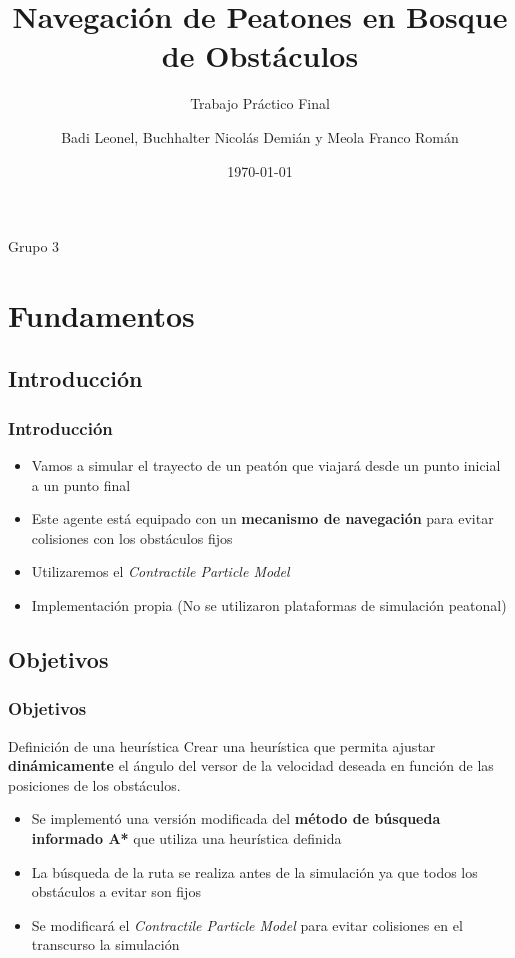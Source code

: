 \documentclass[hyperref={pdfpagelayout=SinglePage}]{beamer}
\title{Navegación de Peatones en Bosque de Obstáculos}
\subtitle{Trabajo Práctico Final}
\author{Badi Leonel, Buchhalter Nicolás Demián y Meola Franco Román}
\date{\today}
\makeatletter
\newcommand{\parttableofcontents}{\@starttoc{parttoc}}
\makeatother
\begin{document}
\begin{frame}[plain]
    \frametitle{} 
    \titlepage
    \centering
	Grupo 3
\end{frame}



\section{Fundamentos}

\subsection{Introducción}

\begin{frame}
\frametitle{Introducción}
\begin{itemize}
	\item Vamos a simular el trayecto de un peatón que viajará desde un punto inicial a un punto final
	\item Este agente está equipado con un \textbf{mecanismo de navegación} para evitar colisiones con los obstáculos fijos
	\item Utilizaremos el \textit{Contractile Particle Model}
	\item Implementación propia (No se utilizaron plataformas de simulación peatonal)
\end{itemize}
\end{frame}

\subsection{Objetivos}

\begin{frame}
\frametitle{Objetivos}
\begin{block}{Definición de una heurística}
Crear una heurística que permita ajustar \textbf{dinámicamente} el ángulo del versor de la velocidad deseada en función de las posiciones de los obstáculos.
\end{block}
\begin{itemize}
	\item Se implementó una versión modificada del \textbf{método de búsqueda informado A*} que utiliza una heurística definida
	\item La búsqueda de la ruta se realiza antes de la simulación ya que todos los obstáculos a evitar son fijos
	\item Se modificará el \textit{Contractile Particle Model} para evitar colisiones en el transcurso la simulación  
\end{itemize}
\end{frame}
\end{document}
